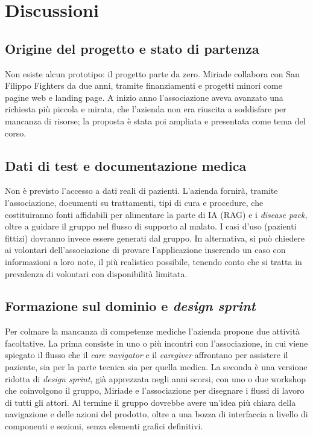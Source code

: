 \documentclass[11pt, a4paper]{article}
\begin{document}
\section{Discussioni}

\subsection{Origine del progetto e stato di partenza}
Non esiste alcun prototipo: il progetto parte da zero. Miriade collabora con San Filippo Fighters da due anni, tramite finanziamenti e progetti minori come pagine web e landing page. A inizio anno l'associazione aveva avanzato una richiesta più piccola e mirata, che l'azienda non era riuscita a soddisfare per mancanza di risorse; la proposta è stata poi ampliata e presentata come tema del corso.

\subsection{Dati di test e documentazione medica}
Non è previsto l'accesso a dati reali di pazienti. L'azienda fornirà, tramite l'associazione, documenti su trattamenti, tipi di cura e procedure, che costituiranno fonti affidabili per alimentare la parte di IA (RAG) e i \emph{disease pack}, oltre a guidare il gruppo nel flusso di supporto al malato. I casi d'uso (pazienti fittizi) dovranno invece essere generati dal gruppo. In alternativa, si può chiedere ai volontari dell'associazione di provare l'applicazione inserendo un caso con informazioni a loro note, il più realistico possibile, tenendo conto che si tratta in prevalenza di volontari con disponibilità limitata.

\subsection{Formazione sul dominio e \emph{design sprint}}
Per colmare la mancanza di competenze mediche l'azienda propone due attività facoltative. La prima consiste in uno o più incontri con l'associazione, in cui viene spiegato il flusso che il \emph{care navigator} e il \emph{caregiver} affrontano per assistere il paziente, sia per la parte tecnica sia per quella medica. La seconda è una versione ridotta di \emph{design sprint}, già apprezzata negli anni scorsi, con uno o due workshop che coinvolgono il gruppo, Miriade e l'associazione per disegnare i flussi di lavoro di tutti gli attori. Al termine il gruppo dovrebbe avere un'idea più chiara della navigazione e delle azioni del prodotto, oltre a una bozza di interfaccia a livello di componenti e sezioni, senza elementi grafici definitivi.
\end{document}
